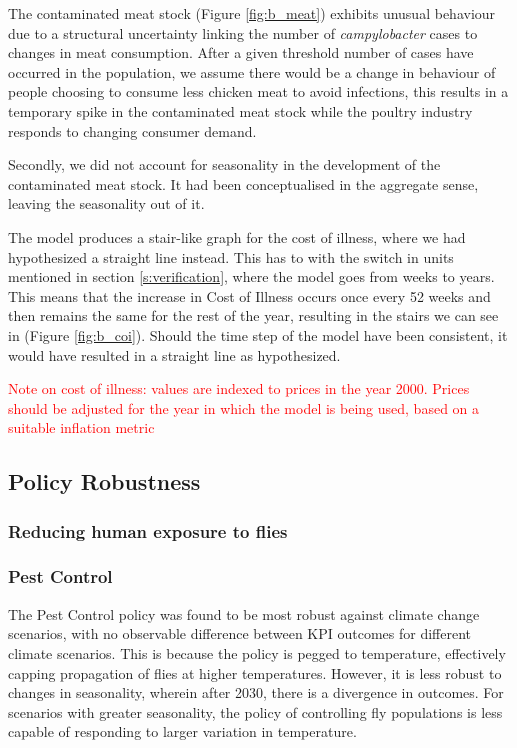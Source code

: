 The contaminated meat stock (Figure \ref{fig:b_meat}) exhibits unusual behaviour due to a structural uncertainty linking the number of \textit{campylobacter} cases to changes in meat consumption. After a given threshold number of cases have occurred in the population, we assume there would be a change in behaviour of people choosing to consume less chicken meat to avoid infections, this results in a temporary spike in the contaminated meat stock while the poultry industry responds to changing consumer demand.

Secondly, we did not account for seasonality in the development of the contaminated meat stock. It had been conceptualised in the aggregate sense, leaving the seasonality out of it. 

The model produces a stair-like graph for the cost of illness, where we had hypothesized a straight line instead. This has to with the switch in units mentioned in section \ref{s:verification}, where the model goes from weeks to years. This means that the increase in Cost of Illness occurs once every 52 weeks and then remains the same for the rest of the year, resulting in the stairs we can see in (Figure \ref{fig:b_coi}). Should the time step of the model have been consistent, it would have resulted in a straight line as hypothesized. 

\textcolor{red}{Note on cost of illness: values are indexed to prices in the year 2000. Prices should be adjusted for the year in which the model is being used, based on a suitable inflation metric}

\subsection{Policy Robustness}
\subsubsection{Reducing human exposure to flies}
\label{reducing human exposure to flies}



\subsubsection{Pest Control}
\label{sec: pest control}
The Pest Control policy was found to be most robust against climate change scenarios, with no observable difference between KPI outcomes for different climate scenarios. This is because the policy is pegged to temperature, effectively capping propagation of flies at higher temperatures. However, it is less robust to changes in seasonality, wherein after 2030, there is a divergence in outcomes. For scenarios with greater seasonality, the policy of controlling fly populations is less capable of responding to larger variation in temperature.


